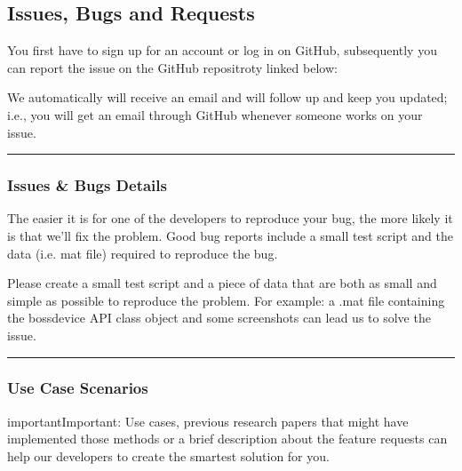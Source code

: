 \documentclass[letterpaper,10pt,english]{sphinxmanual}
\begin{document}
\subsection{Issues, Bugs and Requests}
\label{\detokenize{15_IssuesBugsRequests:issues-bugs-and-requests}}\label{\detokenize{15_IssuesBugsRequests::doc}}
\sphinxAtStartPar
You first have to sign up for an account or log in on GitHub, subsequently you can report the issue on the GitHub repositroty linked below:

\begin{sphinxVerbatim}[commandchars=\\\{\}]
\end{sphinxVerbatim}

\sphinxAtStartPar
We automatically will receive an email and will follow up and keep you updated; i.e., you will get an email through GitHub whenever someone works on your issue.


\bigskip\hrule\bigskip



\subsubsection{Issues \& Bugs Details}
\label{\detokenize{15_IssuesBugsRequests:issues-bugs-details}}
\sphinxAtStartPar
The easier it is for one of the developers to reproduce your bug, the more likely it is that we’ll fix the problem. Good bug reports include a small test script and the data (i.e. mat file) required to reproduce the bug.

\sphinxAtStartPar
Please create a small test script and a piece of data that are both as small and simple as possible to reproduce the problem. For example: a .mat file containing the bossdevice API class object and some screenshots can lead us to solve the issue.


\bigskip\hrule\bigskip



\subsubsection{Use Case Scenarios}
\label{\detokenize{15_IssuesBugsRequests:use-case-scenarios}}
\begin{sphinxadmonition}{important}{Important:}
\sphinxAtStartPar
Use cases, previous research papers that might have implemented those methods or a brief description about the feature requests can help our developers to create the smartest solution for you.
\end{sphinxadmonition}
\end{document}
